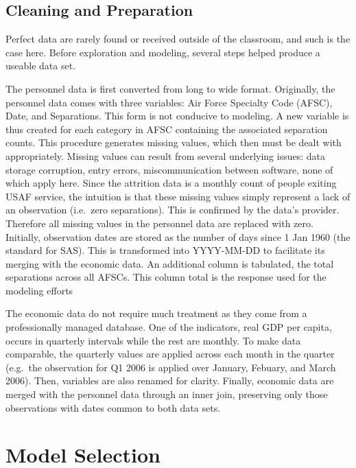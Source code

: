 \documentclass[12pt,letterpaper,toc=flat,oneside]{report}
\theoremstyle{definition}
\theoremstyle{definition}
\theoremstyle{definition}
\theoremstyle{remark}
\begin{document}
\hypertarget{cleaning-and-preparation}{%
\subsection{Cleaning and Preparation}\label{cleaning-and-preparation}}

Perfect data are rarely found or received outside of the classroom, and
such is the case here. Before exploration and modeling, several steps
helped produce a useable data set.

The personnel data is first converted from long to wide format.
Originally, the personnel data comes with three variables: Air Force
Specialty Code (AFSC), Date, and Separations. This form is not conducive
to modeling. A new variable is thus created for each category in AFSC
containing the associated separation counts. This procedure generates
missing values, which then must be dealt with appropriately. Missing
values can result from several underlying issues: data storage
corruption, entry errors, miscommunication between software, none of
which apply here. Since the attrition data is a monthly count of people
exiting USAF service, the intuition is that these missing values simply
represent a lack of an observation (i.e.~zero separations). This is
confirmed by the data's provider. Therefore all missing values in the
personnel data are replaced with zero. Initially, observation dates are
stored as the number of days since 1 Jan 1960 (the standard for SAS).
This is transformed into YYYY-MM-DD to facilitate its merging with the
economic data. An additional column is tabulated, the total separations
across all AFSCs. This column total is the response used for the
modeling efforts

The economic data do not require much treatment as they come from a
professionally managed database. One of the indicators, real GDP per
capita, occurs in quarterly intervals while the rest are monthly. To
make data comparable, the quarterly values are applied across each month
in the quarter (e.g.~the observation for Q1 2006 is applied over
January, Febuary, and March 2006). Then, variables are also renamed for
clarity. Finally, economic data are merged with the personnel data
through an inner join, preserving only those observations with dates
common to both data sets.

\hypertarget{model-selection}{%
\section{Model Selection}\label{model-selection}}
\end{document}
